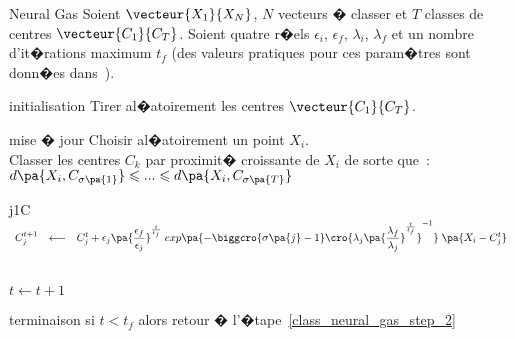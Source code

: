         \begin{xalgorithm}{Neural Gas}
        \label{classif_algo_neural_gas}
        Soient $\vecteur{X_1}{X_N}$, $N$ vecteurs � classer et $T$ classes de centres $\vecteur{C_1}{C_T}$. 
        Soient quatre r�els $\epsilon_i$,  $\epsilon_f$, $\lambda_i$, $\lambda_f$ et un nombre 
        d'it�rations maximum $t_f$ (des valeurs pratiques pour ces param�tres sont donn�es 
        dans~).

        \begin{xalgostep}{initialisation}
        Tirer al�atoirement les centres $\vecteur{C_1}{C_T}$. \\
        \end{xalgostep}

        \begin{xalgostep}{mise � jour} \label{class_neural_gas_step_2}
        Choisir al�atoirement un point $X_i$. \\
        Classer les centres $C_k$ par proximit� croissante de $X_i$ de sorte que~:
        $d\pa{X_i,C_{\sigma\pa{1}}} \leqslant ... \leqslant d\pa{X_i,C_{\sigma\pa{T}}}$ \\
        \begin{xfor}{j}{1}{C}
        $
        \begin{array}{lcl}
        C_j^{t+1} &\longleftarrow&  C_j^t +      \epsilon_j \pa{\dfrac{\epsilon_f}{\epsilon_j}}^{\frac{t}{t_f}} \; 
                                                                                    exp\pa{
                                                                                            - \biggcro{ \sigma\pa{j} - 1 }  
                                                                                            \cro{ \lambda_j \pa{\dfrac{\lambda_f}{\lambda_j}}^{\frac{t}{t_f}} } ^{-1}
                                                                                    }
                                                                                    \; \pa{ X_i - C_j^t    }
        \end{array}                                                                
        $
        \end{xfor} \\
        $ t \longleftarrow t+1$
        \end{xalgostep}

        \begin{xalgostep}{terminaison} \label{class_rpcl_step_3}
        si $t < t_f$ alors retour � l'�tape~\ref{class_neural_gas_step_2}
        \end{xalgostep}

        \end{xalgorithm}


